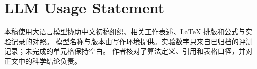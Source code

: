 \section*{LLM Usage Statement}
本稿使用大语言模型协助中文初稿组织、相关工作表述、LaTeX 排版和公式与实验记录的对照。
模型名称与版本由写作环境提供。实验数字只来自已归档的评测记录；未完成的单元格保持空白。
作者核对了算法定义、引用和表格口径，并对正文中的科学结论负责。
